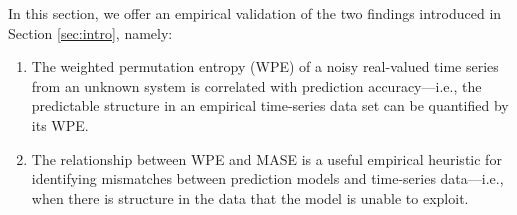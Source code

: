 


In this section, we offer an empirical validation of the two findings
introduced in Section \ref{sec:intro}, namely:

\begin{enumerate}

\item The weighted permutation entropy (WPE) of a noisy real-valued
  time series from an unknown system is correlated with prediction
  accuracy---i.e., the predictable structure in an empirical
  time-series data set can be quantified by its WPE.

\item The relationship between WPE and MASE is a useful empirical
  heuristic for identifying mismatches between prediction models and
  time-series data---i.e., when there is structure in the data that
  the model is unable to exploit.

\end{enumerate}





